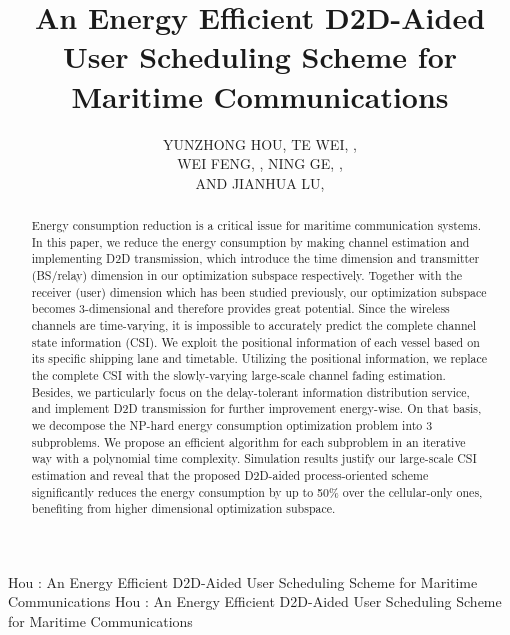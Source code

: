 \documentclass{ieeeaccess}
\begin{document}

\title{An Energy Efficient D2D-Aided User Scheduling Scheme for Maritime Communications}
\author{\uppercase{Yunzhong Hou}, 
\uppercase{Te Wei}, ,\\
\uppercase{Wei Feng}, , 
\uppercase{Ning Ge}, ,
\\ \uppercase{and Jianhua Lu}, }

\address[1]{Tsinghua National Laboratory for Information Science and Technology, Tsinghua University, Beijing 100084, P. R. China}


\markboth
{Hou \headeretal: An Energy Efficient D2D-Aided User Scheduling Scheme for Maritime Communications}
{Hou \headeretal: An Energy Efficient D2D-Aided User Scheduling Scheme for Maritime Communications}


\begin{abstract}

Energy consumption reduction is a critical issue for maritime communication systems. 
In this paper, we reduce the energy consumption by making channel estimation and implementing D2D transmission, which introduce the time dimension and transmitter (BS/relay) dimension in our optimization subspace respectively. Together with the receiver (user) dimension which has been studied previously, our optimization subspace becomes 3-dimensional and therefore provides great potential. 
Since the wireless channels are time-varying, it is impossible to accurately predict the complete channel state information (CSI). We exploit the positional information of each vessel based on its specific shipping lane and timetable. Utilizing the positional information, we replace the complete CSI with the slowly-varying large-scale channel fading estimation. Besides, we particularly focus on the delay-tolerant information distribution service, and implement D2D transmission for further improvement energy-wise. 
On that basis, we decompose the NP-hard energy consumption optimization problem into 3 subproblems. We propose an efficient algorithm for each subproblem in an iterative way with a polynomial time complexity. 
Simulation results justify our large-scale CSI estimation and reveal that the proposed D2D-aided process-oriented scheme significantly reduces the energy consumption by up to 50\% over the cellular-only ones, benefiting from higher dimensional optimization subspace.

\end{abstract}
\end{document}
